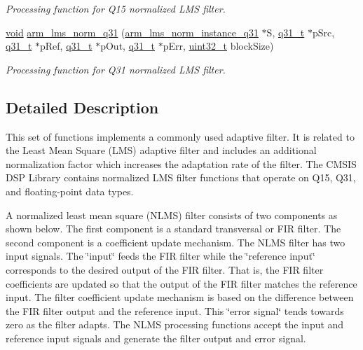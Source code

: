 \begin{DoxyCompactItemize}
\begin{DoxyCompactList}\small\item\em Processing function for Q15 normalized L\-M\-S filter. \end{DoxyCompactList}\item 
\hyperlink{group___n_a_m_e_ga18028b8badbf1ea7e704ccac3c488e82}{void} \hyperlink{group___l_m_s___n_o_r_m_ga7128775e99817c183a7d7ad34e8b6e05}{arm\-\_\-lms\-\_\-norm\-\_\-q31} (\hyperlink{structarm__lms__norm__instance__q31}{arm\-\_\-lms\-\_\-norm\-\_\-instance\-\_\-q31} $\ast$S, \hyperlink{arm__math_8h_adc89a3547f5324b7b3b95adec3806bc0}{q31\-\_\-t} $\ast$p\-Src, \hyperlink{arm__math_8h_adc89a3547f5324b7b3b95adec3806bc0}{q31\-\_\-t} $\ast$p\-Ref, \hyperlink{arm__math_8h_adc89a3547f5324b7b3b95adec3806bc0}{q31\-\_\-t} $\ast$p\-Out, \hyperlink{arm__math_8h_adc89a3547f5324b7b3b95adec3806bc0}{q31\-\_\-t} $\ast$p\-Err, \hyperlink{stdint_8h_a435d1572bf3f880d55459d9805097f62}{uint32\-\_\-t} block\-Size)
\begin{DoxyCompactList}\small\item\em Processing function for Q31 normalized L\-M\-S filter. \end{DoxyCompactList}\end{DoxyCompactItemize}


\subsection{Detailed Description}
This set of functions implements a commonly used adaptive filter. It is related to the Least Mean Square (L\-M\-S) adaptive filter and includes an additional normalization factor which increases the adaptation rate of the filter. The C\-M\-S\-I\-S D\-S\-P Library contains normalized L\-M\-S filter functions that operate on Q15, Q31, and floating-\/point data types.

A normalized least mean square (N\-L\-M\-S) filter consists of two components as shown below. The first component is a standard transversal or F\-I\-R filter. The second component is a coefficient update mechanism. The N\-L\-M\-S filter has two input signals. The \char`\"{}input\char`\"{} feeds the F\-I\-R filter while the \char`\"{}reference input\char`\"{} corresponds to the desired output of the F\-I\-R filter. That is, the F\-I\-R filter coefficients are updated so that the output of the F\-I\-R filter matches the reference input. The filter coefficient update mechanism is based on the difference between the F\-I\-R filter output and the reference input. This \char`\"{}error signal\char`\"{} tends towards zero as the filter adapts. The N\-L\-M\-S processing functions accept the input and reference input signals and generate the filter output and error signal. 

